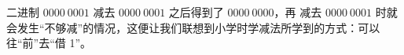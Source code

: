     二进制 $0000\ 0001$ 减去 $0000\ 0001$ 之后得到了 $0000\ 0000$，再 减去 $0000\ 0001$ 时就会发生“不够减”的情况，这便让我们联想到小学时学减法所学到的方式：可以往“前”去“借 1”。

%
%
